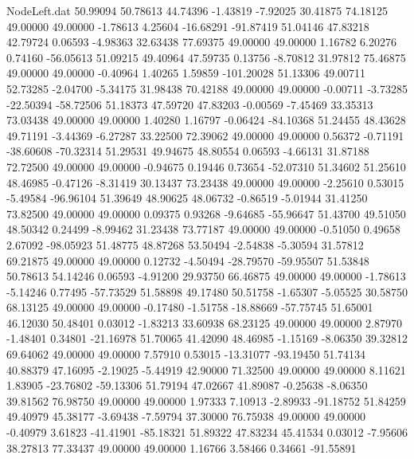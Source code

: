 \begin{filecontents}{NodeLeft.dat}
  50.99094   50.78613   44.74396    -1.43819   -7.92025   30.41875   74.18125   49.00000   49.00000   -1.78613    4.25604  -16.68291  -91.87419
  51.04146   47.83218   42.79724     0.06593   -4.98363   32.63438   77.69375   49.00000   49.00000    1.16782    6.20276    0.74160  -56.05613
  51.09215   49.40964   47.59735     0.13756   -8.70812   31.97812   75.46875   49.00000   49.00000   -0.40964    1.40265    1.59859 -101.20028
  51.13306   49.00711   52.73285    -2.04700   -5.34175   31.98438   70.42188   49.00000   49.00000   -0.00711   -3.73285  -22.50394  -58.72506
  51.18373   47.59720   47.83203    -0.00569   -7.45469   33.35313   73.03438   49.00000   49.00000    1.40280    1.16797   -0.06424  -84.10368
  51.24455   48.43628   49.71191    -3.44369   -6.27287   33.22500   72.39062   49.00000   49.00000    0.56372   -0.71191  -38.60608  -70.32314
  51.29531   49.94675   48.80554     0.06593   -4.66131   31.87188   72.72500   49.00000   49.00000   -0.94675    0.19446    0.73654  -52.07310
  51.34602   51.25610   48.46985    -0.47126   -8.31419   30.13437   73.23438   49.00000   49.00000   -2.25610    0.53015   -5.49584  -96.96104
  51.39649   48.90625   48.06732    -0.86519   -5.01944   31.41250   73.82500   49.00000   49.00000    0.09375    0.93268   -9.64685  -55.96647
  51.43700   49.51050   48.50342     0.24499   -8.99462   31.23438   73.77187   49.00000   49.00000   -0.51050    0.49658    2.67092  -98.05923
  51.48775   48.87268   53.50494    -2.54838   -5.30594   31.57812   69.21875   49.00000   49.00000    0.12732   -4.50494  -28.79570  -59.95507
  51.53848   50.78613   54.14246     0.06593   -4.91200   29.93750   66.46875   49.00000   49.00000   -1.78613   -5.14246    0.77495  -57.73529
  51.58898   49.17480   50.51758    -1.65307   -5.05525   30.58750   68.13125   49.00000   49.00000   -0.17480   -1.51758  -18.88669  -57.75745
  51.65001   46.12030   50.48401     0.03012   -1.83213   33.60938   68.23125   49.00000   49.00000    2.87970   -1.48401    0.34801  -21.16978
  51.70065   41.42090   48.46985    -1.15169   -8.06350   39.32812   69.64062   49.00000   49.00000    7.57910    0.53015  -13.31077  -93.19450
  51.74134   40.88379   47.16095    -2.19025   -5.44919   42.90000   71.32500   49.00000   49.00000    8.11621    1.83905  -23.76802  -59.13306
  51.79194   47.02667   41.89087    -0.25638   -8.06350   39.81562   76.98750   49.00000   49.00000    1.97333    7.10913   -2.89933  -91.18752
  51.84259   49.40979   45.38177    -3.69438   -7.59794   37.30000   76.75938   49.00000   49.00000   -0.40979    3.61823  -41.41901  -85.18321
  51.89322   47.83234   45.41534     0.03012   -7.95606   38.27813   77.33437   49.00000   49.00000    1.16766    3.58466    0.34661  -91.55891

\end{filecontents}
